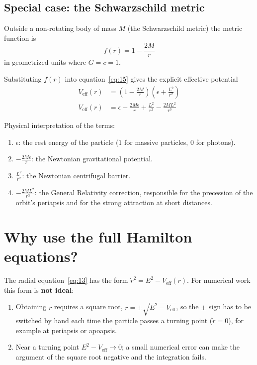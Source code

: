 \documentclass[11pt,a4paper]{article}
\newcommand{\Veff}{V_{\text{eff}}}
\begin{document}
\subsection*{Special case: the Schwarzschild metric}

Outside a non-rotating body of mass $M$ (the Schwarzschild metric) the metric function is
\begin{equation*}
f(r) = 1 - \frac{2M}{r} \tag{16}\label{eq:16}
\end{equation*}
in geometrized units where $G = c = 1$.

Substituting $f(r)$ into equation~\eqref{eq:15} gives the explicit effective potential
\begin{align*}
    \Veff(r) &= \left( 1 - \frac{2M}{r} \right) \left( \epsilon + \frac{L^2}{r^2} \right) \\
    \Veff(r) &= \epsilon - \frac{2M\epsilon}{r} + \frac{L^2}{r^2} - \frac{2ML^2}{r^3} \tag{17}\label{eq:17}
\end{align*}

Physical interpretation of the terms:
\begin{enumerate}
  \item $\epsilon$: the rest energy of the particle ($1$ for massive particles, $0$ for photons).
  \item $-\frac{2M\epsilon}{r}$: the Newtonian gravitational potential.
  \item $\frac{L^2}{r^2}$: the Newtonian centrifugal barrier.
  \item $-\frac{2ML^2}{r^3}$: the General Relativity correction, responsible for the precession of the orbit's periapsis and for the strong attraction at short distances.
\end{enumerate}

\section{Why use the full Hamilton equations?}

The radial equation~\eqref{eq:13} has the form $\dot{r}^2 = E^2 - \Veff(r)$. For numerical work this form is \textbf{not ideal}:
\begin{enumerate}
  \item Obtaining $\dot{r}$ requires a square root, $\dot{r} = \pm\sqrt{E^2 - \Veff}$, so the $\pm$ sign has to be switched by hand each time the particle passes a turning point ($\dot{r} = 0$), for example at periapsis or apoapsis.
  \item Near a turning point $E^2 - \Veff \to 0$; a small numerical error can make the argument of the square root negative and the integration fails.
\end{enumerate}
\end{document}
